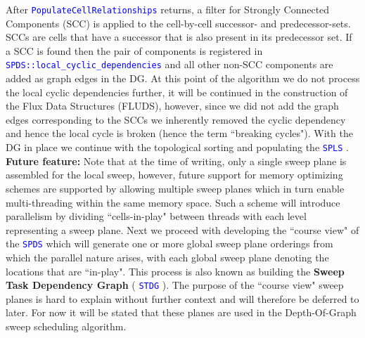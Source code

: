 \documentclass[11pt,letterpaper,titlepage]{article}
\newcommand{\xmltag}[1]{\textcolor{blue}{ \texttt{#1}} }
\numberwithin{equation}{section}
\begin{document}
\vspace{0.25in}
After \xmltag{PopulateCellRelationships} returns, a filter for Strongly Connected Components (SCC) is applied to the cell-by-cell successor- and predecessor-sets. SCCs are cells that have a successor that is also present in its predecessor set. If a SCC is found then the pair of components is registered in \xmltag{SPDS::local\_cyclic\_dependencies} and all other non-SCC components are added as graph edges in the DG. At this point of the algorithm we do not process the local cyclic dependencies further, it will be continued in the construction of the Flux Data Structures (FLUDS), however, since we did not add the graph edges corresponding to the SCCs we inherently removed the cyclic dependency and hence the local cycle is broken (hence the term ``breaking cycles"). With the DG in place we continue with the topological sorting and populating the \xmltag{SPLS}.
\newline
\newline
{\color{red} \textbf{Future feature:}} Note that at the time of writing, only a single sweep plane is assembled for the local sweep, however, future support for memory optimizing schemes are supported by allowing multiple sweep planes which in turn enable multi-threading within the same memory space. Such a scheme will introduce parallelism by dividing ``cells-in-play" between threads with each level representing a sweep plane.
\newline
\newline
Next we proceed with developing the ``course view" of the \xmltag{SPDS} which will generate one or more global sweep plane orderings from which the parallel nature arises, with each global sweep plane denoting the locations that are ``in-play". This process is also known as building the \textbf{Sweep Task Dependency Graph} (\xmltag{STDG}). The purpose of the ``course view" sweep planes is hard to explain without further context and will therefore be deferred to later. For now it will be stated that these planes are used in the Depth-Of-Graph sweep scheduling algorithm. 
\newline
\newline
\end{document}
